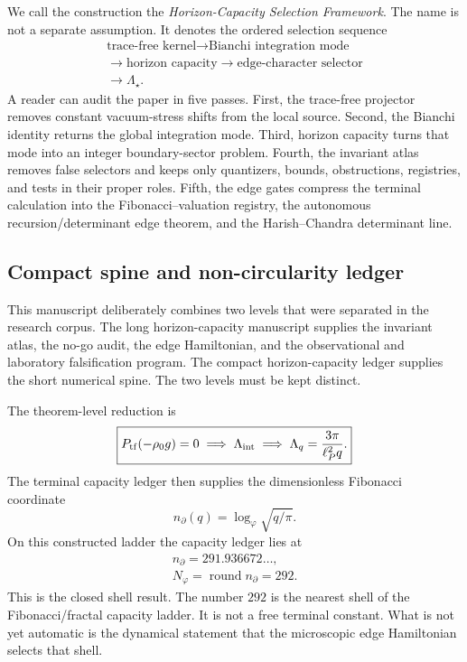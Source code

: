 \documentclass[aps,prd,reprint,nofootinbib,superscriptaddress,floatfix]{revtex4-2}
\numberwithin{equation}{section}
\theoremstyle{definition}
\theoremstyle{plain}
\begin{document}
We call the construction the \emph{Horizon-Capacity Selection Framework}.  The name is not a
separate assumption.  It denotes the ordered selection sequence
\[
\boxed{
\begin{gathered}
\text{trace-free kernel}\to\text{Bianchi integration mode}\\
\to\text{horizon capacity}\to\text{edge-character selector}\\
\to\Lambda_\star .
\end{gathered}
}
\]
A reader can audit the paper in five passes.  First, the trace-free projector
removes constant vacuum-stress shifts from the local source.  Second, the
Bianchi identity returns the global integration mode.  Third, horizon capacity
turns that mode into an integer boundary-sector problem.  Fourth, the invariant
atlas removes false selectors and keeps only quantizers, bounds, obstructions,
registries, and tests in their proper roles.  Fifth, the edge gates compress
the terminal calculation into the Fibonacci--valuation registry, the autonomous
recursion/determinant edge theorem, and the Harish--Chandra determinant line.


\subsection{Compact spine and non-circularity ledger}
\label{subsec:compact-spine-combined}

This manuscript deliberately combines two levels that were separated in the
research corpus.  The long horizon-capacity manuscript supplies the invariant
atlas, the no-go audit, the edge Hamiltonian, and the observational and
laboratory falsification program.  The compact horizon-capacity ledger supplies
the short numerical spine.  The two levels must be kept distinct.

The theorem-level reduction is
\[
\boxed{
P_{\rm tf}(-\rho_0g)=0
\;\Longrightarrow\;
\Lambda_{\rm int}
\;\Longrightarrow\;
\Lambda_q=\frac{3\pi}{\ell_P^2q}.
}
\]
The terminal capacity ledger then supplies the dimensionless Fibonacci
coordinate
\[
\boxed{
n_\partial(q)=\log_\varphi\sqrt{q/\pi}.
}
\]
On this constructed ladder the capacity ledger lies at
\[
\boxed{
\begin{gathered}
n_\partial=291.936672\ldots,\\
N_\varphi=\operatorname{round}n_\partial=292.
\end{gathered}}
\]
This is the closed shell result.  The number \(292\) is the nearest shell of
the Fibonacci/fractal capacity ladder.  It is not a free terminal constant.
What is not yet automatic is the dynamical statement that the microscopic
edge Hamiltonian selects that shell.
\end{document}
